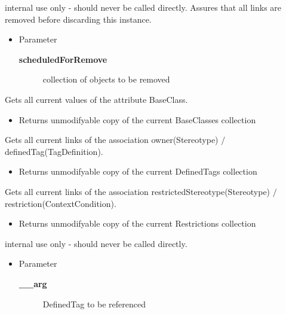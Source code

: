 \begin{desc}internal use only - should never be called directly.
 Assures that all links are removed before
 discarding this instance.
\begin{itemize}
\item{Parameter
  \begin{description}
   \item[{\bf scheduledForRemove}]{collection of objects to be removed}
  \end{description}}
\end{itemize}
\end{desc}

\begin{desc}Gets all current values of the attribute BaseClass.
\begin{itemize}
\item{Returns unmodifyable copy of the current BaseClasses collection }
\end{itemize}
\end{desc}

\begin{desc}Gets all current links of the association owner(Stereotype)
 $/$ definedTag(TagDefinition).
\begin{itemize}
\item{Returns unmodifyable copy of the current DefinedTags collection }
\end{itemize}
\end{desc}

\begin{desc}Gets all current links of the association restrictedStereotype(Stereotype)
 $/$ restriction(ContextCondition).
\begin{itemize}
\item{Returns unmodifyable copy of the current Restrictions collection }
\end{itemize}
\end{desc}

\begin{desc}internal use only - should never be called directly.
\begin{itemize}
\item{Parameter
  \begin{description}
   \item[{\bf \_\_arg}]{DefinedTag to be referenced}
  \end{description}}
\end{itemize}
\end{desc}

